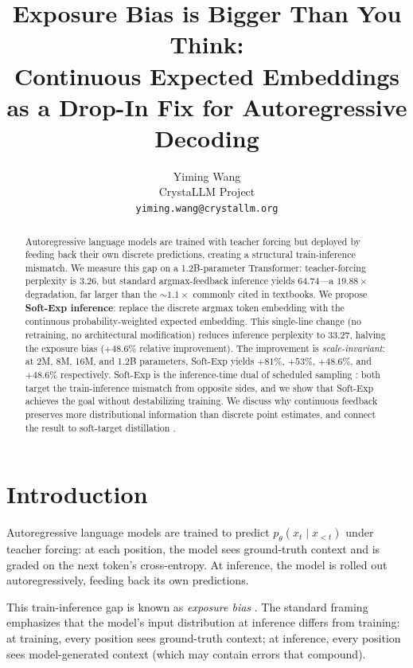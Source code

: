\documentclass{article}
\title{Exposure Bias is Bigger Than You Think:\\
       Continuous Expected Embeddings as a Drop-In Fix for Autoregressive Decoding}
\author{%
  Yiming Wang \\
  CrystaLLM Project \\
  \texttt{yiming.wang@crystallm.org} \\
}
\begin{document}
\maketitle

\begin{abstract}
Autoregressive language models are trained with teacher forcing but deployed by feeding back their own discrete predictions, creating a structural train-inference mismatch. We measure this gap on a 1.2B-parameter Transformer: teacher-forcing perplexity is 3.26, but standard argmax-feedback inference yields 64.74---a $19.88\times$ degradation, far larger than the $\sim 1.1\times$ commonly cited in textbooks. We propose \textbf{Soft-Exp inference}: replace the discrete argmax token embedding with the continuous probability-weighted expected embedding. This single-line change (no retraining, no architectural modification) reduces inference perplexity to 33.27, halving the exposure bias ($+48.6\%$ relative improvement). The improvement is \emph{scale-invariant}: at 2M, 8M, 16M, and 1.2B parameters, Soft-Exp yields $+81\%$, $+53\%$, $+48.6\%$, and $+48.6\%$ respectively. Soft-Exp is the inference-time dual of scheduled sampling \citep{bengio2015scheduled}: both target the train-inference mismatch from opposite sides, and we show that Soft-Exp achieves the goal without destabilizing training. We discuss why continuous feedback preserves more distributional information than discrete point estimates, and connect the result to soft-target distillation \citep{hinton2015distill}.
\end{abstract}

\section{Introduction}

Autoregressive language models are trained to predict $p_\theta(x_t \mid x_{<t})$ under teacher forcing: at each position, the model sees ground-truth context and is graded on the next token's cross-entropy. At inference, the model is rolled out autoregressively, feeding back its own predictions.

This train-inference gap is known as \emph{exposure bias} \citep{bengio2015scheduled}. The standard framing emphasizes that the model's input distribution at inference differs from training: at training, every position sees ground-truth context; at inference, every position sees model-generated context (which may contain errors that compound).
\end{document}
